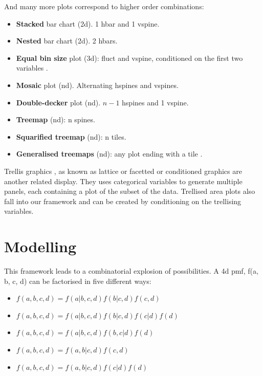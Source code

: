 \documentclass[letterpaper,oneside]{scrartcl}
\begin{document}
\noindent And many more plots correspond to higher order combinations:

\begin{itemize}
  \item {\bf Stacked} bar chart (2d). 1 hbar and 1 vspine.
  \item {\bf Nested} bar chart (2d).  2 hbars. \citep{peltier:2009}

  \item {\bf Equal bin size} plot (3d): fluct and vspine, conditioned on the first two variables \citep{hofmann:2000}.

  \item {\bf Mosaic} plot (nd).  Alternating hspines and vspines.  \citep{hartigan:1984,hartigan:1981,friendly:1994,hofmann:2003}
  \item {\bf Double-decker} plot (nd).  $n-1$ hspines and 1 vspine. \citep{hofmann:2001}
  \item {\bf Treemap} (nd): n spines. \citep{shneiderman:1992}
  \item {\bf Squarified treemap} (nd): n tiles. \citep{bruls:1999}
  \item {\bf Generalised treemaps} (nd): any plot ending with a tile \citep{vliegen:2006}.

\end{itemize}

Trellis graphics \citep{becker:1996}, as known as lattice or facetted or
conditioned graphics are another related display. They uses categorical
variables to generate multiple panels, each containing a plot of the subset of
the data. Trellised area plots also fall into our framework and can be
created by conditioning on the trellising variables.


\section{Modelling}
\label{sec:models}

This framework leads to a combinatorial explosion of possibilities. A 4d pmf, f(a, b, c, d) can be factorised in five different ways:

\begin{itemize}
  \item $f(a, b, c, d) = f(a | b, c, d) f(b | c, d) f(c, d)$
  \item $f(a, b, c, d) = f(a | b, c, d) f(b | c, d) f(c | d) f(d)$
  \item $f(a, b, c, d) = f(a | b, c, d) f(b, c | d) f(d)$
  \item $f(a, b, c, d) = f(a, b | c, d) f(c, d)$
  \item $f(a, b, c, d) = f(a, b | c, d) f(c | d) f(d)$
\end{itemize}
\end{document}
